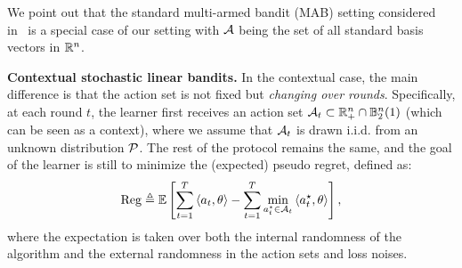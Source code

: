We point out that the standard multi-armed bandit (MAB) setting considered in~\citet{schlisselberg2024delay} is a special case of our setting with ${\mathcal{A}}$ being the set of all standard basis vectors in $\mathbb{R}^n$.


\textbf{Contextual stochastic linear bandits.} In the contextual case, the main difference is that the action set is not fixed but \emph{changing over rounds}. Specifically, at each round $t$, the learner first receives an action set ${\mathcal{A}}_t\subset \mathbb{R}_+^n\cap \mathbb{B}_2^n(1)$ (which can be seen as a context), where we assume that ${\mathcal{A}}_t$ is drawn i.i.d. from an unknown distribution ${\mathcal{P}}$. The rest of the protocol remains the same, and the goal of the learner is still to minimize the (expected) pseudo regret, defined as:
\begin{align*}
    {\mathrm{Reg}}\triangleq \mathbb{E}
    \left[\sum_{t=1}^T\left\langle {a_t,\theta} \right\rangle - \sum_{t=1}^T\min_{a_t^\star\in{\mathcal{A}}_t}\left\langle {a_t^\star,\theta} \right\rangle\right],
\end{align*}
where the expectation is taken over both the internal randomness of the algorithm and the external randomness in the action sets and loss noises.
